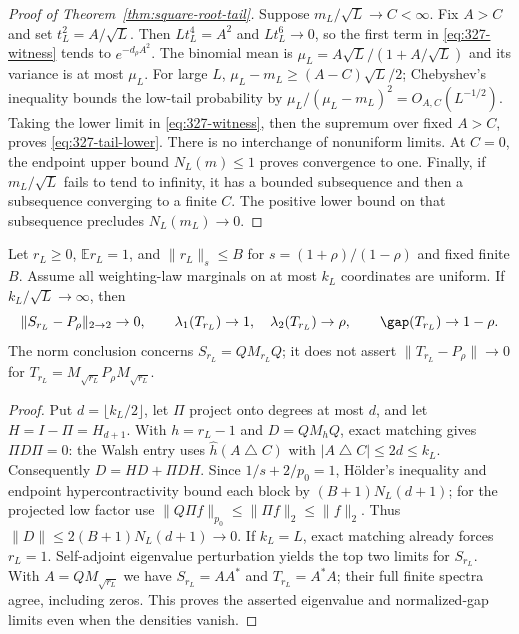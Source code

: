 \begin{proof}[Proof of Theorem~\ref{thm:square-root-tail}]
Suppose $m_L/\sqrt L\to C<\infty$. Fix $A>C$ and set
$t_L^2=A/\sqrt L$. Then $Lt_L^4=A^2$ and $Lt_L^6\to0$, so the
first term in \eqref{eq:327-witness} tends to $e^{-d_\rho A^2}$.
The binomial mean is $\mu_L=A\sqrt L/(1+A/\sqrt L)$ and its
variance is at most $\mu_L$. For large $L$,
$\mu_L-m_L\geq(A-C)\sqrt L/2$; Chebyshev's inequality bounds
the low-tail probability by $\mu_L/(\mu_L-m_L)^2=O_{A,C}(L^{-1/2})$.
Taking the lower limit in \eqref{eq:327-witness}, then the supremum over
fixed $A>C$, proves \eqref{eq:327-tail-lower}. There is no interchange
of nonuniform limits. At $C=0$, the endpoint upper bound $N_L(m)\leq1$
proves convergence to one.
Finally, if $m_L/\sqrt L$ fails to tend to infinity, it has a bounded
subsequence and then a subsequence converging to a finite $C$.
The positive lower bound on that subsequence precludes $N_L(m_L)\to0$.
\end{proof}

\begin{corollary}
\label{cor:327-marginals}
Let $r_L\geq0$, $\mathbb E r_L=1$, and
$\|r_L\|_s\leq B$ for $s=(1+\rho)/(1-\rho)$ and fixed finite $B$.
Assume all weighting-law marginals on at most $k_L$ coordinates are
uniform. If $k_L/\sqrt L\to\infty$, then
\[
 \|S_{r_L}-P_\rho\|_{2\to2}\to0,\qquad
 \lambda_1(T_{r_L})\to1,\quad\lambda_2(T_{r_L})\to\rho,
 \qquad \gap(T_{r_L})\to1-\rho.
\]
The norm conclusion concerns $S_{r_L}=QM_{r_L}Q$; it does not assert
$\|T_{r_L}-P_\rho\|\to0$ for $T_{r_L}=M_{\sqrt{r_L}}P_\rho M_{\sqrt{r_L}}$.
\end{corollary}
\begin{proof}
Put $d=\lfloor k_L/2\rfloor$, let $\Pi$ project onto degrees at most
$d$, and let $H=I-\Pi=H_{d+1}$. With $h=r_L-1$ and $D=QM_hQ$,
exact matching gives $\Pi D\Pi=0$: the Walsh entry uses
$\widehat h(A\mathbin\triangle C)$ with $|A\mathbin\triangle C|\leq2d\leq k_L$.
Consequently $D=HD+\Pi DH$. Since $1/s+2/p_0=1$,
H\"older's inequality and endpoint hypercontractivity bound each block
by $(B+1)N_L(d+1)$; for the projected low factor use
$\|Q\Pi f\|_{p_0}\leq\|\Pi f\|_2\leq\|f\|_2$.
Thus $\|D\|\leq2(B+1)N_L(d+1)\to0$. If $k_L=L$, exact matching
already forces $r_L=1$. Self-adjoint eigenvalue perturbation yields the
top two limits for $S_{r_L}$. With $A=QM_{\sqrt{r_L}}$ we have
$S_{r_L}=AA^*$ and $T_{r_L}=A^*A$; their full finite spectra agree,
including zeros. This proves the asserted eigenvalue and normalized-gap
limits even when the densities vanish.
\end{proof}

